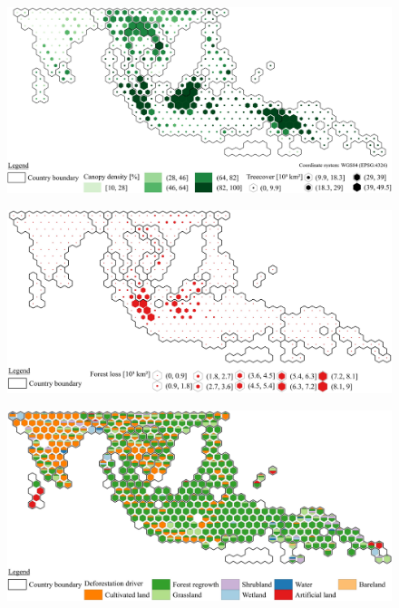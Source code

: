 	    \begin{figure}[ht]
		    \centering
		    \includegraphics[scale=1]{img/asia_treecover_frameless}
		    \caption[Ecosystem service values]{}
		    \label{fig:asiacover}
	    \end{figure}
	    \begin{figure}[ht]
		    \centering
		    \includegraphics[scale=1]{img/asia_loss_frameless}
		    \caption[Ecosystem service values]{}
		    \label{fig:asialoss}
	    \end{figure}
	    \begin{figure}[ht]
		    \centering
		    \includegraphics[scale=1]{img/asia_driver_frameless}
		    \caption[Ecosystem service values]{}
		    \label{fig:asiadriver}
	    \end{figure}
